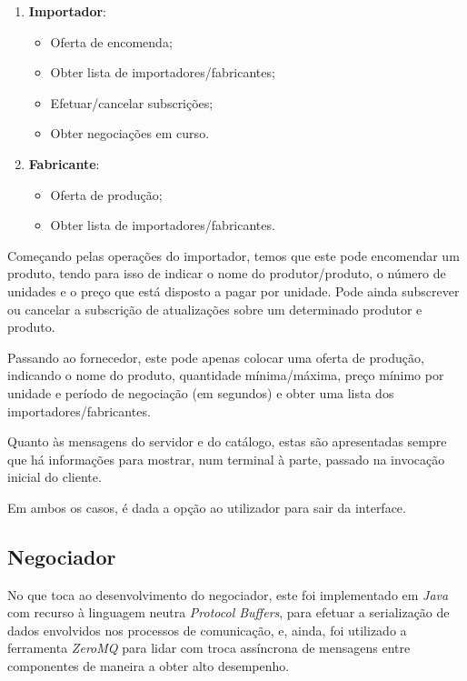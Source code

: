 \documentclass[a4paper]{report}
\begin{document}
	\begin{enumerate}
		\item \textbf{Importador}:
		\begin{itemize}
			\item Oferta de encomenda;
			\item Obter lista de importadores/fabricantes;
			\item Efetuar/cancelar subscrições;
			\item Obter negociações em curso.
		\end{itemize}

		\item \textbf{Fabricante}:
		\begin{itemize}
			\item Oferta de produção;
			\item Obter lista de importadores/fabricantes.
		\end{itemize}
	\end{enumerate}

	Começando pelas operações do importador, temos que este pode encomendar um produto, tendo para isso de indicar o nome do produtor/produto, o número de unidades e o preço que está disposto a pagar por unidade. Pode ainda subscrever ou cancelar a subscrição de atualizações sobre um determinado produtor e produto.

	Passando ao fornecedor, este pode apenas colocar uma oferta de produção, indicando o nome do produto, quantidade mínima/máxima, preço mínimo por unidade e período de negociação (em segundos) e obter uma lista dos importadores/fabricantes.

	Quanto às mensagens do servidor e do catálogo, estas são apresentadas sempre que há informações para mostrar, num terminal à parte, passado na invocação inicial do cliente.
	
	Em ambos os casos, é dada a opção ao utilizador para sair da interface.

	\subsection{Negociador}
	No que toca ao desenvolvimento do negociador, este foi implementado em \textit{Java} com recurso à linguagem neutra \textit{Protocol Buffers}, para efetuar a serialização de dados envolvidos nos processos de comunicação, e, ainda, foi utilizado a ferramenta \textit{ZeroMQ} para lidar com troca assíncrona de mensagens entre componentes de maneira a obter alto desempenho. 
	
\end{document}
